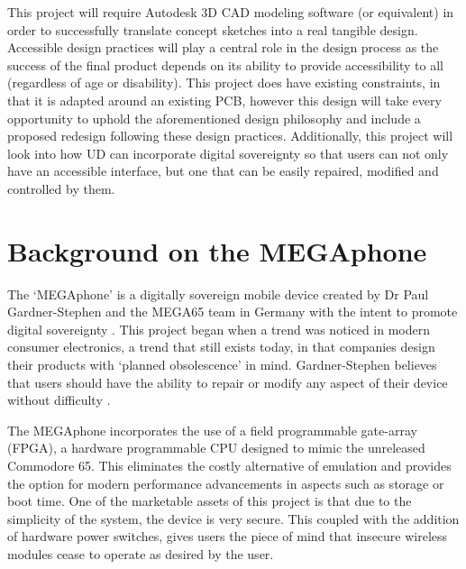 This project will require Autodesk 3D CAD modeling software (or equivalent) in order to successfully translate concept sketches into a real tangible design. 
Accessible design practices will play a central role in the design process as the success of the final product depends on its ability to provide accessibility to all (regardless of age or disability). 
This project does have existing constraints, in that it is adapted around an existing PCB, however this design will take every opportunity to uphold the aforementioned design philosophy and include a proposed redesign following these design practices.
Additionally, this project will look into how UD can incorporate digital sovereignty so that users can not only have an accessible interface, but one that can be easily repaired, modified and controlled by them.


\section{Background on the MEGAphone}

The ‘MEGAphone’ is a digitally sovereign mobile device created by Dr Paul Gardner-Stephen and the MEGA65 team in Germany with the intent to promote digital sovereignty \cite{mega65}.
This project began when a trend was noticed in modern consumer electronics, a trend that still exists today, in that companies design their products with ‘planned obsolescence’ in mind. 
Gardner-Stephen believes that users should have the ability to repair or modify any aspect of their device without difficulty \cite{mobilehistory}.

The MEGAphone incorporates the use of a field programmable gate-array (FPGA), a hardware programmable CPU designed to mimic the unreleased Commodore 65.
This eliminates the costly alternative of emulation and provides the option for modern performance advancements in aspects such as storage or boot time.
One of the marketable assets of this project is that due to the simplicity of the system, the device is very secure.
This coupled with the addition of hardware power switches, gives users the piece of mind that insecure wireless modules cease to operate as desired by the user.

